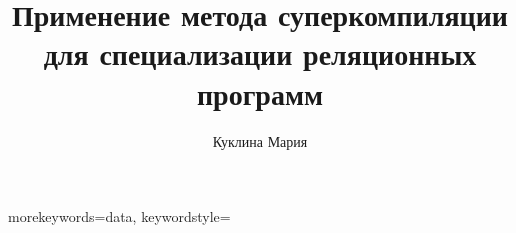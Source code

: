 
\title{Применение метода суперкомпиляции для специализации реляционных программ}

\author{Куклина Мария}


\maketitle







{
  morekeywords={data},
  keywordstyle=\bfseries\color{black}
}


\newcommand{\larrow}{\leftarrow}
\newcommand{\rarrow}{\rightarrow}

\newcommand{\embed}{\unlhd}
\newcommand{\instance}{\preccurlyeq}
\newcommand{\strictinst}{\prec}
\newcommand{\variant}{\approx}
\newcommand{\genup}{\lessdot}

\newcommand{\ukanren}{$\mu$Kanren }
\newcommand{\forcpd}{конъюнктивной частичной дедукции }
\newcommand{\cpd}{конъюнктивная частичная дедукция }
\newcommand{\Cpd}{Конъюнктивная частичная дедукция }

\newcommand{\origin}[1]{(англ. {\it #1})}

\newcommand{\rel}[1]{$\text{#1}^o$}

\newcommand{\todo}[1]{{\bf\color{red}TODO: #1}}

\graphicspath{{Kuklina/}}

% 

% 
\setcounter{figure}{0}
\setcounter{page}{4}







\renewcommand{\refname}{Список использованных источников}

\renewcommand{\refname}{Приложение A}


% 
